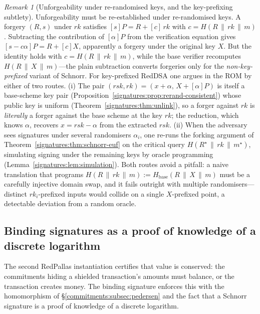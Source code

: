\documentclass[11pt,a4paper]{article}
\theoremstyle{definition}
\theoremstyle{remark}
\newtheorem{remark}[theorem]{Remark}
\begin{document}
\begin{remark}[Unforgeability under re-randomised keys, and the
key-prefixing subtlety]\label{signatures:rem:rerand-euf}
Unforgeability must be re-established under re-randomised keys. A
forgery \((R, s)\) under \(rk\) satisfies \([s]P = R + [c]\,rk\) with
\(c = H(R \,\|\, rk \,\|\, m)\). Subtracting the contribution of
\([\alpha]P\) from the verification equation gives
\([s - c\alpha]P = R + [c]X\), apparently a forgery under the
original key \(X\). But the identity holds with
\(c = H(R \,\|\, rk \,\|\, m)\), while the base verifier recomputes
\(H(R \,\|\, X \,\|\, m)\)---the plain subtraction converts
forgeries only for the \emph{non-key-prefixed} variant of Schnorr.
For key-prefixed RedDSA one argues in the ROM by either of two
routes. (i) The pair
\((rsk, rk) = (x + \alpha,\, X + [\alpha]P)\) is itself a
base-scheme key pair (Proposition~\ref{signatures:prop:rerand-consistent})
whose public key is uniform (Theorem~\ref{signatures:thm:unlink}),
so a forger against \(rk\) is \emph{literally} a forger against the
base scheme at the key \(rk\); the reduction, which knows
\(\alpha\), recovers \(x = rsk - \alpha\) from the extracted
\(rsk\). (ii) When the adversary sees signatures under several
randomisers \(\alpha_i\), one re-runs the forking argument of
Theorem~\ref{signatures:thm:schnorr-euf} on the critical query
\(H(R^{\star} \,\|\, rk \,\|\, m^{\star})\), simulating signing
under the remaining keys by oracle programming
(Lemma~\ref{signatures:lem:simulation}). Both routes avoid a
pitfall: a naive translation that programs
\(H(R \,\|\, rk \,\|\, m) := H_{\mathrm{base}}(R \,\|\, X \,\|\, m)\)
must be a carefully injective domain swap, and it fails outright
with multiple randomisers---distinct \(rk_i\)-prefixed inputs would
collide on a single \(X\)-prefixed point, a detectable deviation
from a random oracle.
\end{remark}

\subsection{Binding signatures as a proof of knowledge of a discrete
logarithm}\label{signatures:subsec:binding}

The second RedPallas instantiation certifies that value is conserved:
the commitments hiding a shielded transaction's amounts must balance,
or the transaction creates money. The binding signature enforces this
with the homomorphism of \S\ref{commitments:subsec:pedersen} and the
fact that a Schnorr signature is a proof of knowledge of a discrete
logarithm.
\end{document}
